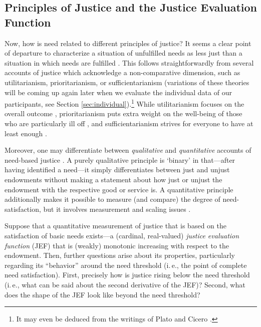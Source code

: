 \documentclass[12pt]{scrartcl}
\begin{document}
\subsection{Principles of Justice and the Justice Evaluation Function}\label{sec:principles}
Now, how is need related to different principles of justice?
It seems a clear point of departure to characterize a situation of unfulfilled needs as less just than a situation in which needs are fulfilled \citep{kipnis_economic_1985}.
This follows straightforwardly from several accounts of justice which acknowledge a non-comparative dimension, such as utilitarianism, prioritarianism, or sufficientarianism (variations of these theories will be coming up again later when we evaluate the individual data of our participants, see Section \ref{sec:individual}).\footnote{It may even be deduced from the writings of Plato and Cicero \citep[see][]{siebel_each_2017}.}
While utilitarianism focuses on the overall outcome \citep[e.\,g.,][]{bentham_introduction_2009,mill_utilitarianism_1998}, prioritarianism puts extra weight on the well-being of those who are particularly ill off \citep[e.\,g.,][]{parfit_equality_1997}, and sufficientarianism strives for everyone to have at least enough \citep[e.\,g.,][]{frankfurt_equality_1987,crisp_egalitarianism_2003,schramme_is_2006}.

Moreover, one may differentiate between \textit{qualitative} and \textit{quantitative} accounts of need-based justice \citep[see][]{siebel_need_2020}.
A purely qualitative principle is `binary' in that---after having identified a need---it simply differentiates between just and unjust endowments without making a statement about how just or unjust the endowment with the respective good or service is.
A quantitative principle additionally makes it possible to measure (and compare) the degree of need-satisfaction, but it involves measurement and scaling issues \citep[see][]{diederich_identifying_2020}.

Suppose that a quantitative measurement of justice that is based on the satisfaction of basic needs exists---a (cardinal, real-valued) \textit{justice evaluation function} (JEF) that is (weakly) monotonic increasing with respect to the endowment.
Then, further questions arise about its properties, particularly regarding its ``behavior'' around the need threshold (i.\,e., the point of complete need satisfaction).
First, precisely how is justice rising below the need threshold (i.\,e., what can be said about the second derivative of the JEF)?
Second, what does the shape of the JEF look like beyond the need threshold?
\end{document}
